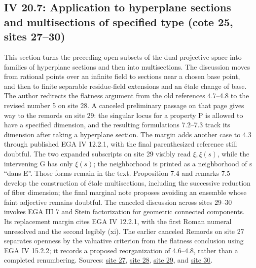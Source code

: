 \subsection*{IV 20.7: Application to hyperplane sections and multisections of specified type (cote 25, sites 27--30)}
This section turns the preceding open subsets of the dual projective space into families of hyperplane sections and then into multisections. The discussion moves from rational points over an infinite field to sections near a chosen base point, and then to finite separable residue-field extensions and an étale change of base. The author redirects the flatness argument from the old references 4.7--4.8 to the revised number 5 on site 28. A canceled preliminary passage on that page gives way to the remords on site 29: the singular locus for a property P is allowed to have a specified dimension, and the resulting formulations 7.2--7.3 track its dimension after taking a hyperplane section. The margin adds another case to 4.3 through published EGA IV 12.2.1, with the final parenthesized reference still doubtful. The two expanded subscripts on site 29 visibly read $\xi,\xi(s)$, while the intervening G has only $\xi(s)$; the neighborhood is printed as a neighborhood of s ``dans E''. Those forms remain in the text. Proposition 7.4 and remarks 7.5 develop the construction of étale multisections, including the successive reduction of fiber dimension; the final marginal note proposes avoiding an ensemble whose faint adjective remains doubtful. The canceled discussion across sites 29--30 invokes EGA III 7 and Stein factorization for geometric connected components. Its replacement margin cites EGA IV 12.2.1, with the first Roman numeral unresolved and the second legibly (xi). The earlier canceled Remords on site 27 separates openness by the valuative criterion from the flatness conclusion using EGA IV 15.2.2; it records a proposed reorganization of 4.6--4.8, rather than a completed renumbering. Sources: \href{https://grothendieck.umontpellier.fr/web/viewer.html?file=../25.pdf\#page=28}{site 27}, \href{https://grothendieck.umontpellier.fr/web/viewer.html?file=../25.pdf\#page=29}{site 28}, \href{https://grothendieck.umontpellier.fr/web/viewer.html?file=../25.pdf\#page=30}{site 29}, and \href{https://grothendieck.umontpellier.fr/web/viewer.html?file=../25.pdf\#page=31}{site 30}.
